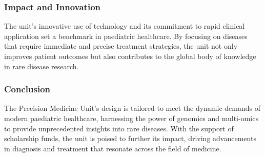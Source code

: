 \subsubsection*{Impact and Innovation}
The unit’s innovative use of technology and its commitment to rapid clinical application set a benchmark in paediatric healthcare. By focusing on diseases that require immediate and precise treatment strategies, the unit not only improves patient outcomes but also contributes to the global body of knowledge in rare disease research.

\subsubsection*{Conclusion}
The Precision Medicine Unit’s design is tailored to meet the dynamic demands of modern paediatric healthcare, harnessing the power of genomics and multi-omics to provide unprecedented insights into rare diseases. With the support of scholarship funds, the unit is poised to further its impact, driving advancements in diagnosis and treatment that resonate across the field of medicine.
